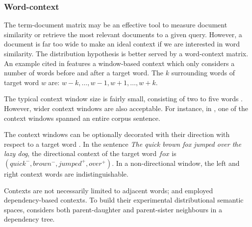 \subsubsection{Word-context}
The term-document matrix may be an effective tool to measure document similarity or retrieve the most relevant documents to a given query.  However, a document is far too wide to make an ideal context if we are interested in word similarity.  The distribution hypothesis is better served by a word-context matrix.  An example cited in \citep{turney2010frequency} features a window-based context which only considers a number of words before and after a target word.  The $k$ surrounding words of target word $w$ are: $w-k, \ldots, w-1, w+1, \ldots, w+k $.   

The typical context window size is fairly small, consisting of two to five words \citep{roller2014inclusive, santus2014chasing, shwartz2017siege}.  However, wider context windows are also acceptable.  For instance, in \citep{roller2014inclusive}, one of the context windows spanned an entire corpus sentence.

The context windows can be optionally decorated with their direction with respect to a target word \citep{shwartz2017siege}.  In the sentence \textit{The quick brown fox jumped over the lazy dog}, the directional context of the target word $fox$ is $(quick^-, brown^-, jumped^+, over^+)$. In a non-directional window, the left and right context words are indistinguishable.  

Contexts are not necessarily limited to adjacent words; \citep{lin1998information} and \citep{levy2014dependency} employed dependency-based contexts.  To build their experimental distributional semantic spaces, \citep{shwartz2017siege} considers both parent-daughter and parent-sister neighbours in a dependency tree.

